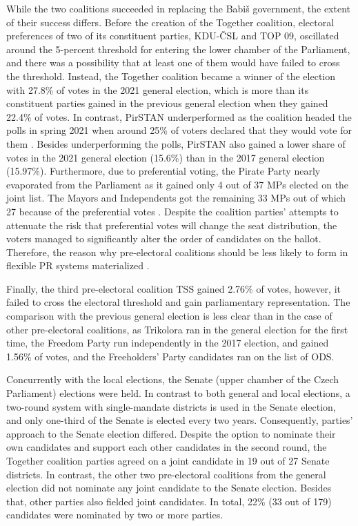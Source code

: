 \documentclass[]{interact}
\theoremstyle{plain}%
\theoremstyle{definition}
\theoremstyle{remark}
\begin{document}
While the two coalitions succeeded in replacing the Babiš government, the extent of their success differs. Before the creation of the Together coalition, electoral preferences of two of its constituent parties, KDU-ČSL and TOP 09, oscillated around the 5-percent threshold for entering the lower chamber of the Parliament, and there was a possibility that at least one of them would have failed to cross the threshold. Instead, the Together coalition became a winner of the election with 27.8\% of votes in the 2021 general election, which is more than its constituent parties gained in the previous general election when they gained 22.4\% of votes. 
In contrast, PirSTAN underperformed as the coalition headed the polls in spring 2021 when around 25\% of voters declared that they would vote for them \citep[see e.g.][]{linek2022}. Besides underperforming the polls, PirSTAN also gained a lower share of votes in the 2021 general election (15.6\%) than in the 2017 general election (15.97\%).
Furthermore, due to preferential voting, the Pirate Party nearly evaporated from the Parliament as it gained only 4 out of 37 MPs elected on the joint list. The Mayors and Independents got the remaining 33 MPs out of which 27 because of the preferential votes \citep[15]{maskarinec2022}. Despite the coalition parties' attempts to attenuate the risk that preferential votes will change the seat distribution, the voters managed to significantly alter the order of candidates on the ballot. Therefore, the reason why pre-electoral coalitions should be less likely to form in flexible PR systems materialized \citep{ibenskas2016}. 

Finally, the third pre-electoral coalition TSS gained 2.76\% of votes, however, it failed to cross the electoral threshold and gain parliamentary representation. The comparison with the previous general election is less clear than in the case of other pre-electoral coalitions, as Trikolora ran in the general election for the first time, the Freedom Party run independently in the 2017 election, and gained 1.56\% of votes, and the Freeholders' Party candidates ran on the list of ODS.

Concurrently with the local elections, the Senate (upper chamber of the Czech Parliament) elections were held. In contrast to both general and local elections, a two-round system with single-mandate districts is used in the Senate election, and only one-third of the Senate is elected every two years. Consequently, parties' approach to the Senate election differed. 
Despite the option to nominate their own candidates and support each other candidates in the second round, the Together coalition parties agreed on a joint candidate in 19 out of 27 Senate districts. In contrast, the other two pre-electoral coalitions from the general election did not nominate any joint candidate to the Senate election. Besides that, other parties also fielded joint candidates. In total, 22\% (33 out of 179) candidates were nominated by two or more parties.
\end{document}
